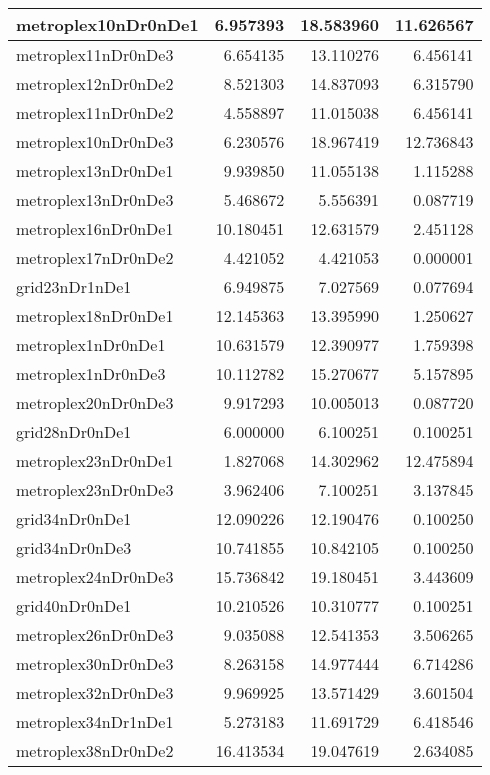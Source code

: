 \documentclass[../../../thesis.tex]{subfiles}
\begin{document}
\begin{longtable}{|l|r|r|r|}
\endfoot
\endlastfoot
metroplex10nDr0nDe1 & 6.957393 & 18.583960 & 11.626567 \\\hline
metroplex11nDr0nDe3 & 6.654135 & 13.110276 & 6.456141 \\\hline
metroplex12nDr0nDe2 & 8.521303 & 14.837093 & 6.315790 \\\hline
metroplex11nDr0nDe2 & 4.558897 & 11.015038 & 6.456141 \\\hline
metroplex10nDr0nDe3 & 6.230576 & 18.967419 & 12.736843 \\\hline
metroplex13nDr0nDe1 & 9.939850 & 11.055138 & 1.115288 \\\hline
metroplex13nDr0nDe3 & 5.468672 & 5.556391 & 0.087719 \\\hline
metroplex16nDr0nDe1 & 10.180451 & 12.631579 & 2.451128 \\\hline
metroplex17nDr0nDe2 & 4.421052 & 4.421053 & 0.000001 \\\hline
grid23nDr1nDe1 & 6.949875 & 7.027569 & 0.077694 \\\hline
metroplex18nDr0nDe1 & 12.145363 & 13.395990 & 1.250627 \\\hline
metroplex1nDr0nDe1 & 10.631579 & 12.390977 & 1.759398 \\\hline
metroplex1nDr0nDe3 & 10.112782 & 15.270677 & 5.157895 \\\hline
metroplex20nDr0nDe3 & 9.917293 & 10.005013 & 0.087720 \\\hline
grid28nDr0nDe1 & 6.000000 & 6.100251 & 0.100251 \\\hline
metroplex23nDr0nDe1 & 1.827068 & 14.302962 & 12.475894 \\\hline
metroplex23nDr0nDe3 & 3.962406 & 7.100251 & 3.137845 \\\hline
grid34nDr0nDe1 & 12.090226 & 12.190476 & 0.100250 \\\hline
grid34nDr0nDe3 & 10.741855 & 10.842105 & 0.100250 \\\hline
metroplex24nDr0nDe3 & 15.736842 & 19.180451 & 3.443609 \\\hline
grid40nDr0nDe1 & 10.210526 & 10.310777 & 0.100251 \\\hline
metroplex26nDr0nDe3 & 9.035088 & 12.541353 & 3.506265 \\\hline
metroplex30nDr0nDe3 & 8.263158 & 14.977444 & 6.714286 \\\hline
metroplex32nDr0nDe3 & 9.969925 & 13.571429 & 3.601504 \\\hline
metroplex34nDr1nDe1 & 5.273183 & 11.691729 & 6.418546 \\\hline
metroplex38nDr0nDe2 & 16.413534 & 19.047619 & 2.634085 \\\hline

\end{longtable}
\end{document}
